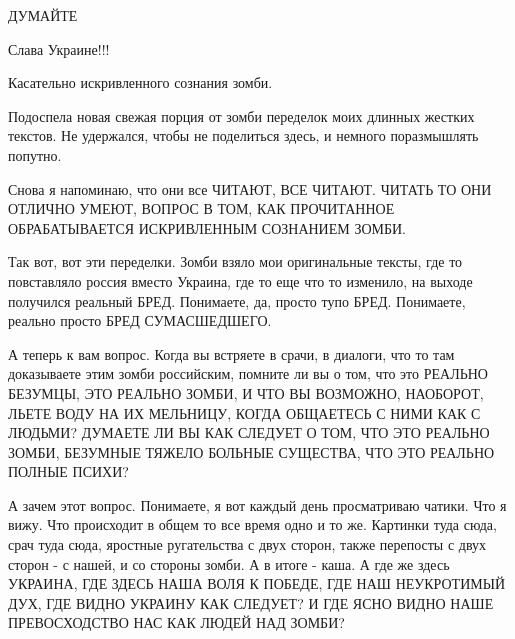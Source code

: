  
 
 
 
 


ДУМАЙТЕ

Слава Украине!!! 💛 💙 💛 💙 💛 💙 💛 💙 💛 💙 💛 💙 💛 💛 💙 💛 💙 💛 💙 💛 💙 💛 💙 💛 💙 💛 💙                           

Касательно искривленного сознания зомби.

Подоспела новая свежая порция от зомби переделок моих длинных жестких текстов.
Не удержался, чтобы не поделиться здесь, и немного поразмышлять попутно. 

Снова я напоминаю, что они все ЧИТАЮТ, ВСЕ ЧИТАЮТ. ЧИТАТЬ ТО ОНИ ОТЛИЧНО УМЕЮТ,
ВОПРОС В ТОМ, КАК ПРОЧИТАННОЕ ОБРАБАТЫВАЕТСЯ ИСКРИВЛЕННЫМ СОЗНАНИЕМ ЗОМБИ.

Так вот, вот эти переделки. Зомби взяло мои оригинальные тексты, где то
повставляло россия вместо Украина, где то еще что то изменило, на выходе
получился реальный БРЕД. Понимаете, да, просто тупо БРЕД. Понимаете, реально
просто БРЕД СУМАСШЕДШЕГО.

А теперь к вам вопрос. Когда вы встряете в срачи, в диалоги, что то там
доказываете этим зомби российским, помните ли вы о том, что это РЕАЛЬНО
БЕЗУМЦЫ, ЭТО РЕАЛЬНО ЗОМБИ, И ЧТО ВЫ ВОЗМОЖНО, НАОБОРОТ, ЛЬЕТЕ ВОДУ НА ИХ
МЕЛЬНИЦУ, КОГДА ОБЩАЕТЕСЬ С НИМИ КАК С ЛЮДЬМИ? ДУМАЕТЕ ЛИ ВЫ КАК СЛЕДУЕТ О ТОМ,
ЧТО ЭТО РЕАЛЬНО ЗОМБИ, БЕЗУМНЫЕ ТЯЖЕЛО БОЛЬНЫЕ СУЩЕСТВА, ЧТО ЭТО РЕАЛЬНО ПОЛНЫЕ
ПСИХИ? 

А зачем этот вопрос. Понимаете, я вот каждый день просматриваю чатики. Что я
вижу. Что происходит в общем то все время одно и то же. Картинки туда сюда,
срач туда сюда, яростные ругательства с двух сторон, также перепосты с двух
сторон - с нашей, и со стороны зомби. А в итоге - каша.  А где же здесь
УКРАИНА, ГДЕ ЗДЕСЬ НАША ВОЛЯ К ПОБЕДЕ, ГДЕ НАШ НЕУКРОТИМЫЙ ДУХ, ГДЕ ВИДНО
УКРАИНУ КАК СЛЕДУЕТ? И ГДЕ ЯСНО ВИДНО НАШЕ ПРЕВОСХОДСТВО НАС КАК ЛЮДЕЙ НАД
ЗОМБИ?

